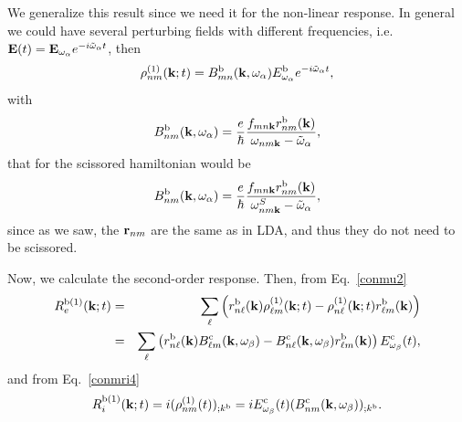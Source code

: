 \documentclass[floatfix,prb,aps,superscriptaddress,11pt,preprint]{revtex4}
\begin{document}
We generalize this result since we need it for the non-linear response.
In general we could have several perturbing fields with different
frequencies,
i.e. $\mathbf{E}(t)=\mathbf{E}_{\omega_\alpha} e^{-i\tilde\omega_\alpha t}$, then
\begin{equation}\label{rhonoi1}
\rho^{(1)}_{nm}(\mathbf{k};t)=B^{\mathrm{b}}_{mn}(\mathbf{k},\omega_\alpha)E_{\omega_\alpha}^{\mathrm{b}}e^{-i\tilde\omega_\alpha t}
,
\end{equation}
with
\begin{equation}\label{rho1} 
B^{\mathrm{b}}_{nm}(\mathbf{k},\omega_\alpha)=\frac{e}{\hbar}\frac{f_{mn\mathbf{k}}r^{\mathrm{b}}_{nm}(\mathbf{k})}{\omega_{nm\mathbf{k}}-\tilde\omega_\alpha}
,
\end{equation} 
that for the scissored hamiltonian would be
\begin{equation}\label{rho1n}
B^{\mathrm{b}}_{nm}(\mathbf{k},\omega_\alpha)=\frac{e}{\hbar}\frac{f_{mn\mathbf{k}}r^{\mathrm{b}}_{nm}(\mathbf{k})}{\omega^S_{nm\mathbf{k}}-\tilde\omega_\alpha}
,
\end{equation}
since as we saw, the $\mathbf{r}_{nm}$ are the same as in LDA, and thus they
do not need to be scissored.

Now, we calculate the second-order response. Then, from Eq.~\eqref{conmu2}
\begin{eqnarray}\label{R1e}
R_e^{\mathrm{b}(1)}(\mathbf{k};t)
&=&
\sum_{\ell}
\left(
r^{\mathrm{b}}_{n\ell}(\mathbf{k})
{\rho}^{(1)}_{\ell m}(\mathbf{k};t)
-
{\rho}^{(1)}_{n\ell}(\mathbf{k};t)
r^{\mathrm{b}}_{\ell m}(\mathbf{k})
\right)
\nonumber \\
&=&
\sum_{\ell}
\left(
r^{\mathrm{b}}_{n\ell}(\mathbf{k})
B^{\mathrm{c}}_{\ell m}(\mathbf{k},\omega_\beta)
-
B^{\mathrm{c}}_{n\ell}(\mathbf{k},\omega_\beta)
r^{\mathrm{b}}_{\ell m}(\mathbf{k})
\right)E_{\omega_\beta}^{\mathrm{c}}(t)
,
\end{eqnarray}
and from Eq.~\eqref{conmri4}
\begin{equation}\label{R1i}
R_i^{\mathrm{b}(1)}(\mathbf{k};t)=i(\rho^{(1)}_{nm}(t))_{;k^{\mathrm{b}}}=iE_{\omega_\beta}^{\mathrm{c}}(t)(B^{\mathrm{c}}_{nm}(\mathbf{k},\omega_\beta))_{;k^{\mathrm{b}}}
.
\end{equation}
\end{document}
